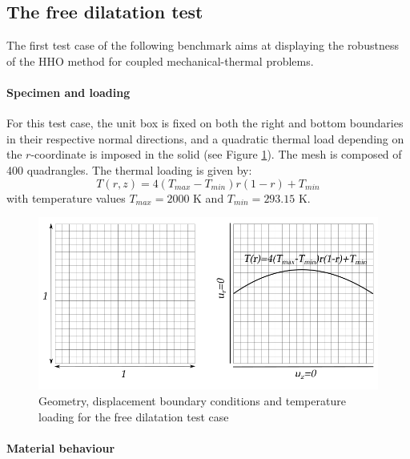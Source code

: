 \subsection{The free dilatation test}
\label{sec_satoh_test}

The first test case of the following benchmark aims at displaying the
robustness of the HHO method for coupled mechanical-thermal problems.

\paragraph{Specimen and loading}

For this test case, the unit box is fixed on both the right and
bottom boundaries in their respective normal directions, and a quadratic
thermal load depending on the $r$-coordinate is imposed in the solid
(see Figure \ref{fig_satoh_setting}). The mesh is composed of 400
quadrangles. The thermal loading is given by:
%
%
%
\begin{equation}
    T(r,z) = 4 (T_{max} - T_{min})r(1 - r) + T_{min}
\end{equation}
%
%
%
with temperature values $T_{max} = 2000$ K and $T_{min} = 293.15$ K.

\begin{figure}[H]
    \centering
    \includegraphics[width=10.cm]{img_calcs/satoh_setting.png}
    \caption{Geometry, displacement boundary conditions and temperature loading for the free dilatation test case}
    \label{fig_satoh_setting}
\end{figure}

\paragraph{Material behaviour}

